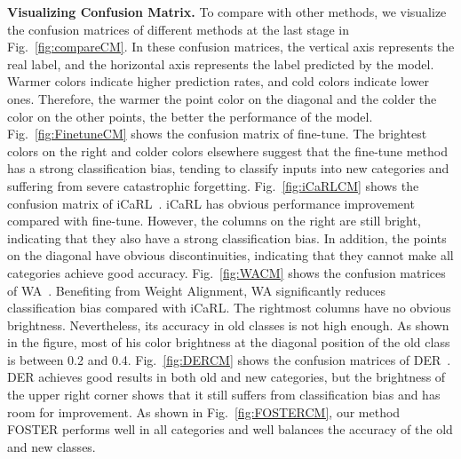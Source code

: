 \documentclass[runningheads]{llncs}
\begin{document}
\noindent \textbf{Visualizing Confusion Matrix.}
To compare with other methods, we visualize the confusion matrices of different methods at the last stage in Fig.~\ref{fig:compareCM}. In these confusion matrices, the vertical axis represents the real label, and the horizontal axis represents the label predicted by the model. Warmer colors indicate higher prediction rates, and cold colors indicate lower ones. Therefore, the warmer the point color on the diagonal and the colder the color on the other points, the better the performance of the model. Fig.~\ref{fig:FinetuneCM} shows the confusion matrix of fine-tune. The brightest colors on the right and colder colors elsewhere suggest that the fine-tune method has a strong classification bias, tending to classify inputs into new categories and suffering from severe catastrophic forgetting. Fig.~\ref{fig:iCaRLCM} shows the confusion matrix of iCaRL~\cite{icarl}. iCaRL has obvious performance improvement compared with fine-tune. However, the columns on the right are still bright, indicating that they also have a strong classification bias. In addition, the points on the diagonal have obvious discontinuities, indicating that they cannot make all categories achieve good accuracy. Fig.~\ref{fig:WACM} shows the confusion matrices of WA~\cite{WA}.  Benefiting from Weight Alignment, WA significantly reduces classification bias compared with iCaRL. The rightmost columns have no obvious brightness. Nevertheless, its accuracy in old classes is not high enough. As shown in the figure, most of his color brightness at the diagonal position of the old class is between 0.2 and 0.4. Fig.~\ref{fig:DERCM} shows the confusion matrices of DER~\cite{der}. DER achieves good results in both old and new categories, but the brightness of the upper right corner shows that it still suffers from classification bias and has room for improvement. As shown in Fig.~\ref{fig:FOSTERCM}, our method FOSTER performs well in all categories and well balances the accuracy of the old and new classes.
\end{document}
